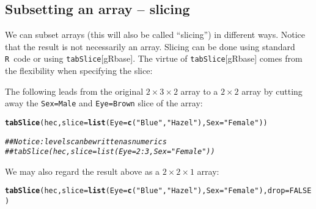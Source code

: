 \documentclass[10pt]{article}\usepackage[]{graphicx}\usepackage[]{xcolor}
\makeatletter
\newcommand{\hlnum}[1]{\textcolor[rgb]{0.686,0.059,0.569}{#1}}%
\newcommand{\hlstr}[1]{\textcolor[rgb]{0.192,0.494,0.8}{#1}}%
\newcommand{\hlcom}[1]{\textcolor[rgb]{0.678,0.584,0.686}{\textit{#1}}}%
\newcommand{\hlstd}[1]{\textcolor[rgb]{0.345,0.345,0.345}{#1}}%
\newcommand{\hlkwc}[1]{\textcolor[rgb]{0.333,0.667,0.333}{#1}}%
\newcommand{\hlkwd}[1]{\textcolor[rgb]{0.737,0.353,0.396}{\textbf{#1}}}%
\newenvironment{kframe}{%
 \def\at@end@of@kframe{}%
 \ifinner\ifhmode%
  \def\at@end@of@kframe{\end{minipage}}%
  \begin{minipage}{\columnwidth}%
 \fi\fi%
 \def\FrameCommand##1{\hskip\@totalleftmargin \hskip-\fboxsep
 \colorbox{shadecolor}{##1}\hskip-\fboxsep
     \hskip-\linewidth \hskip-\@totalleftmargin \hskip\columnwidth}%
 \MakeFramed {\advance\hsize-\width
   \@totalleftmargin\z@ \linewidth\hsize
   \@setminipage}}%
 {\par\unskip\endMakeFramed%
 \at@end@of@kframe}
\newenvironment{knitrout}{}{} %
\def\code#1{\texttt{#1}}
\def\R{\texttt{R}}
\def\rr#1{\code{#1}[{\scriptsize gRbase}]}
\makeatother
\begin{document}
\subsection{Subsetting an array -- slicing}
\label{sec:subsetting-an-array}

We can subset arrays (this will also be called ``slicing'') in
different ways. Notice that the result is not necessarily an
array. Slicing can be done using standard \R\ code or using \rr{tabSlice}.
The virtue of \rr{tabSlice} comes from the flexibility when
specifying the slice:


The following leads from the original $2\times 3 \times 2$
array to a $2 \times 2$
array by cutting away the \code{Sex=Male} and \code{Eye=Brown} slice of the array:
\begin{knitrout}\small
{}\color{fgcolor}\begin{kframe}
\begin{alltt}
\hlkwd{tabSlice}\hlstd{(hec,} \hlkwc{slice}\hlstd{=}\hlkwd{list}\hlstd{(}\hlkwc{Eye}\hlstd{=}\hlkwd{c}\hlstd{(}\hlstr{"Blue"}\hlstd{,} \hlstr{"Hazel"}\hlstd{),} \hlkwc{Sex}\hlstd{=}\hlstr{"Female"}\hlstd{))}
\end{alltt}


{\ttfamily\noindent\bfseries{}}\begin{alltt}
\hlcom{## Notice: levels can be written as numerics}
\hlcom{## tabSlice(hec, slice=list(Eye=2:3, Sex="Female"))}
\end{alltt}
\end{kframe}
\end{knitrout}

We may also regard the result above as a $2 \times 2 \times 1$ array:
\begin{knitrout}\small
{}\color{fgcolor}\begin{kframe}
\begin{alltt}
\hlkwd{tabSlice}\hlstd{(hec,} \hlkwc{slice}\hlstd{=}\hlkwd{list}\hlstd{(}\hlkwc{Eye}\hlstd{=}\hlkwd{c}\hlstd{(}\hlstr{"Blue"}\hlstd{,} \hlstr{"Hazel"}\hlstd{),} \hlkwc{Sex}\hlstd{=}\hlstr{"Female"}\hlstd{),} \hlkwc{drop}\hlstd{=}\hlnum{FALSE}\hlstd{)}
\end{alltt}


{\ttfamily\noindent\bfseries{}}\end{kframe}
\end{knitrout}
\end{document}
